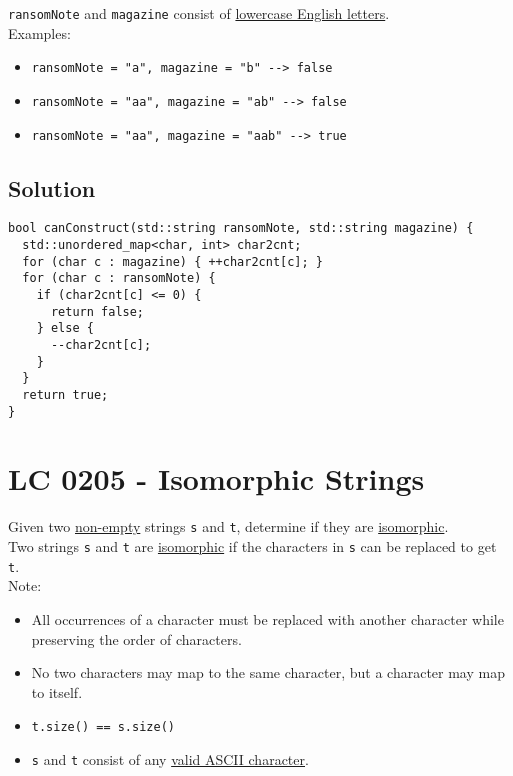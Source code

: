 {{\colorbox{CodeBackground}{\lstinline|ransomNote|}} and {\colorbox{CodeBackground}{\lstinline|magazine|}} consist of \ul{lowercase English letters}.\\

Examples:
\begin{itemize}
	\item {\colorbox{CodeBackground}{\lstinline|ransomNote = "a", magazine = "b" --> false|}}
	\item {\colorbox{CodeBackground}{\lstinline|ransomNote = "aa", magazine = "ab" --> false|}}
	\item {\colorbox{CodeBackground}{\lstinline|ransomNote = "aa", magazine = "aab" --> true|}}
\end{itemize}

\subsection*{Solution}
\begin{lstlisting}
bool canConstruct(std::string ransomNote, std::string magazine) {
  std::unordered_map<char, int> char2cnt;
  for (char c : magazine) { ++char2cnt[c]; }
  for (char c : ransomNote) {
    if (char2cnt[c] <= 0) {
      return false;
    } else {
      --char2cnt[c];
    }
  }
  return true;
}
\end{lstlisting}

\section{LC 0205 - Isomorphic Strings}\label{lc0205}
Given two \ul{non-empty} strings {\colorbox{CodeBackground}{\lstinline|s|}} and {\colorbox{CodeBackground}{\lstinline|t|}}, determine if they are \ul{isomorphic}.\\

Two strings {\colorbox{CodeBackground}{\lstinline|s|}} and {\colorbox{CodeBackground}{\lstinline|t|}} are \ul{isomorphic} if the characters in {\colorbox{CodeBackground}{\lstinline|s|}} can be replaced to get {\colorbox{CodeBackground}{\lstinline|t|}}.\\

Note:
\begin{itemize}
\item All occurrences of a character must be replaced with another character while preserving the order of characters.
\item No two characters may map to the same character, but a character may map to itself.
\item {\colorbox{CodeBackground}{\lstinline|t.size() == s.size()|}}
\item {\colorbox{CodeBackground}{\lstinline|s|}} and {\colorbox{CodeBackground}{\lstinline|t|}} consist of any \ul{valid ASCII character}.
\end{itemize}

}
